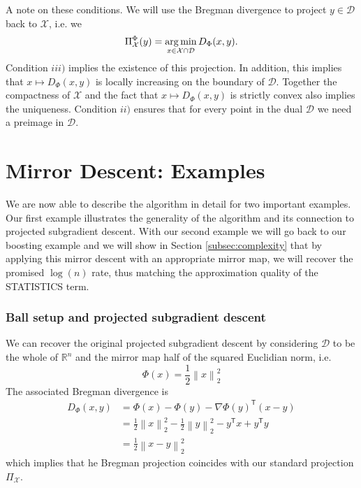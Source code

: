 A note on these conditions. We will use the Bregman divergence to project $y \in \mathcal{D}$ back to $\mathcal{X}$, i.e. we 
\begin{equation*}
	\Pi_\mathcal{X}^\Phi(y) = \operatorname*{arg\,min}_{x\in \mathcal{X}\cap\mathcal{D}} D_\Phi(x, y).
\end{equation*}
Condition $iii)$ implies the existence of this projection. In addition, this implies that $x\mapsto D_\Phi(x, y)$ is locally increasing on the boundary of $\mathcal{D}$. Together the compactness of $\mathcal{X}$ and the fact that $x\mapsto D_\Phi(x, y)$ is strictly convex also implies the uniqueness. 
Condition $ii)$ ensures that for every point in the dual $\mathcal{D}$ we need a preimage in $\mathcal{D}$.



\section{Mirror Descent: Examples}

We are now able to describe the algorithm in detail for two important examples. Our first example illustrates the generality of the algorithm and its connection to projected subgradient descent. With our second example we will go back to our boosting example and we will show in Section \ref{subsec:complexity} that by applying this mirror descent with an appropriate mirror map, we will recover the promised $\log(n)$ rate, thus matching the approximation quality of the STATISTICS term.

\subsubsection{Ball setup and projected subgradient descent}
We can recover the original projected subgradient descent by considering $\mathcal{D}$ to be the whole of $\mathbb{R}^n$ and the mirror map half of the squared Euclidian norm, i.e. 
\begin{equation*}
	\Phi(x) = \frac{1}{2}\left\|x\right\|_2^2
\end{equation*}
The associated Bregman divergence is 
\begin{align*}
	D_\Phi(x, y) &= \Phi(x) - \Phi(y) - \nabla \Phi(y)^\mathsf{T}(x - y) \\
	& = \frac{1}{2}\left\|x\right\|_2^2 - \frac{1}{2}\left\|y\right\|_2^2 - y^\mathsf{T}x + y^\mathsf{T}y \\
	& = \frac{1}{2}\left\|x - y\right\|_2^2
\end{align*}
which implies that he Bregman projection coincides with our standard projection $\Pi_\mathcal{X}$.

